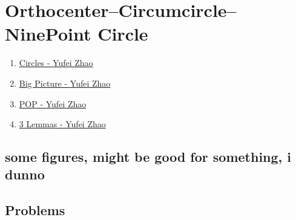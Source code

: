 \graphicspath{{Pics/}}


\newpage\section{Orthocenter--Circumcircle--NinePoint Circle}


\begin{enumerate} [itemsep=0pt]
    \item \href{http://yufeizhao.com/olympiad/imo2008/zhao-circles.pdf}{Circles -
        Yufei Zhao}
    \item \href{http://yufeizhao.com/olympiad/cyclic_quad.pdf}{Big
        Picture - Yufei Zhao} \item
        \href{http://yufeizhao.com/olympiad/power_of_a_point.pdf}{POP - Yufei Zhao}
    \item \href{http://yufeizhao.com/olympiad/three_geometry_lemmas.pdf}{3 Lemmas
        - Yufei Zhao} 
\end{enumerate}


\subsection{some figures, might be good for something, i dunno}




\subsection{Problems}


\begin{minipage}{.65\textwidth} 


\end{minipage}\hfill%
\begin{minipage}{.3\textwidth} 
\end{minipage}







